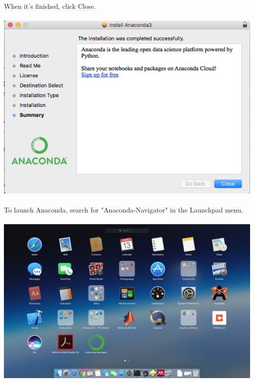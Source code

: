 \documentclass[]{article}
\begin{document}
\paragraph{}
When it's finished, click Close. 
\paragraph{}
\begin{centering}
    \centerline{\includegraphics[scale=0.7]{Screenshot_11.png}}
\end{centering}

\paragraph{}
To launch Anaconda, search for "Anaconda-Navigator" in the Launchpad menu.
\paragraph{}
\begin{centering}
    \centerline{\includegraphics[scale=0.35]{Screenshot_13.png}}
\end{centering}
\end{document}
